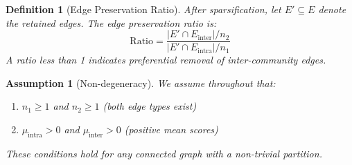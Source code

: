 \documentclass[10pt,journal,compsoc]{IEEEtran}
\newtheorem{definition}{Definition}
\newtheorem{assumption}{Assumption}
\begin{document}
\begin{definition}[Edge Preservation Ratio]
After sparsification, let $E' \subseteq E$ denote the retained edges. The \emph{edge preservation ratio} is:
\begin{equation}
\text{Ratio} = \frac{|E' \cap E_{\text{inter}}| / n_2}{|E' \cap E_{\text{intra}}| / n_1}
\end{equation}
A ratio less than 1 indicates preferential removal of inter-community edges.
\end{definition}


\begin{assumption}[Non-degeneracy]
\label{ass:nondegen}
We assume throughout that:
\begin{enumerate}
    \item $n_1 \geq 1$ and $n_2 \geq 1$ (both edge types exist)
    \item $\mu_{\text{intra}} > 0$ and $\mu_{\text{inter}} > 0$ (positive mean scores)
\end{enumerate}
These conditions hold for any connected graph with a non-trivial partition.
\end{assumption}
\end{document}
